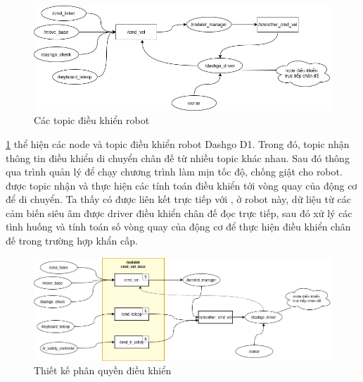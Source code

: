 {\begin{figure}[htbp]
    \centering
    \includegraphics[width=\linewidth]{figures/phanquyen-goc.png}
    \caption{Các topic điều khiển robot}
    \label{fig:phanquyen-goc}
\end{figure}

\figurename{ \ref{fig:phanquyen-goc}} thể hiện các node và topic điều khiển robot Dashgo D1. Trong đó, topic  nhận thông tin điều khiển di chuyển chân đế từ nhiều topic khác nhau. Sau đó thông qua trình quản lý  để chạy chương trình làm mịn tốc độ, chống giật cho robot.  được topic  nhận và thực hiện các tính toán điều khiển tới vòng quay của động cơ để di chuyển.
Ta thấy có  được liên kết trực tiếp với , ở robot này, dữ liệu từ các cảm biến siêu âm được driver điều khiển chân đế đọc trực tiếp, sau đó xử lý các tình huống và tính toán số vòng quay của động cơ để thực hiện điều khiển chân đế trong trường hợp khẩn cấp.


\begin{figure}[htbp]
    \centering
    \includegraphics[width=\linewidth]{figures/phanquen-dexuat.png}
    \caption{Thiết kế phân quyền điều khiển}
    \label{fig:phanquen-dexuat}
\end{figure}

}
